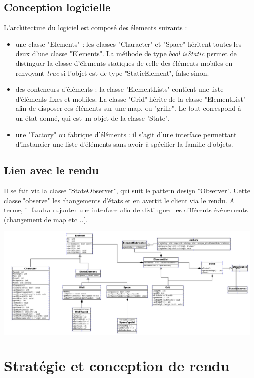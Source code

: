 \documentclass[12pt,a4paper]{report}
\begin{document}
    	\section{Conception logicielle}
	L'architecture du logiciel est composé des élements suivants :
	    \begin{itemize}
	\item une classe "Elements" : les classes "Character" et "Space" héritent toutes les deux d'une classe "Elements". La méthode de type \textit{bool} \textit{isStatic} permet de distinguer la classe d'élements statiques de celle des éléments mobiles en renvoyant \textit{true} si l'objet est de type "StaticElement", false sinon.
	\item des conteneurs d'éléments : la classe "ElementLists" contient une liste d'éléments fixes et mobiles. La classe "Grid" hérite de la classe "ElementList" afin de disposer ces éléments sur une map, ou "grille". Le tout correspond à un état donné, qui est un objet de la classe "State".
	\item une "Factory" ou fabrique d'éléments : il s'agit d'une interface permettant d'instancier une liste d'éléments sans avoir à spécifier la famille d'objets.
        \end{itemize}
	\section{Lien avec le rendu}
	Il se fait via la classe "StateObserver", qui suit le pattern design "Observer". Cette classe "observe" les changements d'états et en avertit le client via le rendu. A terme, il faudra rajouter une interface afin de distinguer les différents évènements (changement de map etc ..).    

\includegraphics[width=1\textwidth]{dia.png}

    \chapter{Stratégie et conception de rendu}
\end{document}
